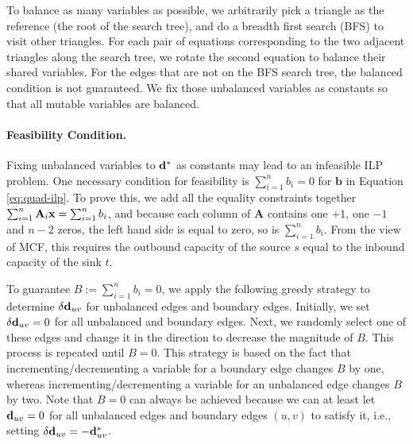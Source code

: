 To balance as many variables as possible, we arbitrarily pick a triangle as the reference (the root of the search tree), and do a breadth first search (BFS) to visit other triangles. For each pair of equations corresponding to the two adjacent triangles along the search tree, we rotate the second equation to balance their shared variables. For the edges that are not on the BFS search tree, the balanced condition is not guaranteed.  We fix those unbalanced variables as constants so that all mutable variables are balanced.


\paragraph*{Feasibility Condition.} Fixing unbalanced variables to ${\mathbf{d}}^*$ as constants may lead to an infeasible ILP problem. One necessary condition for feasibility is $\sum_{i=1}^n b_i=0$ for $\mathbf{b}$ in Equation \eqref{eq:quad-ilp}.  To prove this, we add all the equality constraints together $\sum_{i=1}^n \mathbf{A}_i \mathbf{x} = \sum_{i=1}^n b_i$, and because each column of $\mathbf{A}$ contains one $+1$, one $-1$ and $n-2$ zeros, the left hand side is equal to zero, so is $\sum_{i=1}^n b_i$.  From the view of MCF, this requires the outbound capacity of the source $s$ equal to the inbound capacity of the sink $t$.

To guarantee $B:=\sum_{i=1}^n b_i=0$, we apply the following greedy strategy to determine $\delta \mathbf{d}_{uv}$ for unbalanced edges and boundary edges.  Initially, we set $\delta \mathbf{d}_{uv}=0$ for all unbalanced and boundary edges.  Next, we randomly select one of these edges and change it in the direction to decrease the magnitude of $B$. This process is repeated until $B=0$. This strategy is based on the fact that incrementing/decrementing a variable for a boundary edge changes $B$ by one, whereas incrementing/decrementing a variable for an unbalanced edge changes $B$ by two. Note that $B=0$ can always be achieved because we can at least let ${\mathbf{d}}_{uv}=0$ for all unbalanced edges and boundary edges $(u,v)$ to satisfy it, i.e., setting $\delta \mathbf{d}_{uv} = -{\mathbf{d}}^*_{uv}$.


